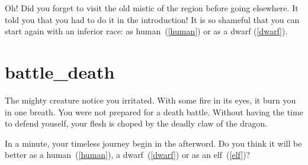 Oh! Did you forget to visit the old mistic of the region before going elsewhere.
It told you that you had to do it in the introduction! It is so shameful that
you can start again with an inferior race: as human~(\ref{human}) or as a dwarf
(\ref{dwarf}).

\section{battle_death}

The mighty creature notice you irritated. With some fire in its eyes, it burn
you in one breath. You were not prepared for a death battle. Without having the
time to defend youself, your flesh is choped by the deadly claw of the dragon.

\medbreak

In a minute, your timeless journey begin in the afterword. Do you think it will
be better as a human~(\ref{human}), a dwarf~(\ref{dwarf}) or as an elf~(\ref{elf})?

